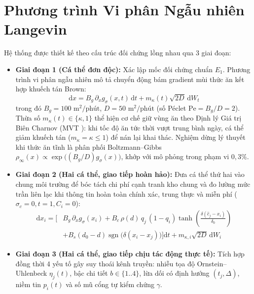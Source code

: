 \documentclass[11pt,a4paper]{report}
\newcommand{\dd}{\mathrm{d}}
\newcommand{\Pe}{\mathrm{Pe}}
\begin{document}
\section{Phương trình Vi phân Ngẫu nhiên Langevin}
Hệ thống được thiết kế theo cấu trúc đối chứng lồng nhau qua 3 giai đoạn:
\begin{itemize}
  \item \textbf{Giai đoạn 1 (Cá thể đơn độc):} Xác lập mốc đối chứng chuẩn $E_1$. Phương trình vi phân ngẫu nhiên mô tả chuyển động bám gradient mùi thức ăn kết hợp khuếch tán Brown:
  \begin{equation}
    \dd x = B_g\,\partial_x g_\sigma(x, t)\,\dd t + m_\kappa(t)\sqrt{2D}\,\dd W_t
  \end{equation}
  trong đó $B_g = 100\text{ m}^2/\text{phút}$, $D = 50\text{ m}^2/\text{phút}$ (số Péclet $\Pe = B_g/D = 2$). Thừa số $m_\kappa(t) \in \{\kappa, 1\}$ thể hiện cơ chế giữ vùng ăn theo Định lý Giá trị Biên Charnov (MVT \cite{charnov}): khi tốc độ ăn tức thời vượt trung bình ngày, cá thể giảm khuếch tán ($m_\kappa = \kappa \le 1$) để nán lại khai thác. Nghiệm dừng lý thuyết khi thức ăn tĩnh là phân phối Boltzmann--Gibbs $\rho_\infty(x) \propto \exp\big((B_g/D)g_\sigma(x)\big)$, khớp với mô phỏng trong phạm vi $0{,}3\%$.

  \item \textbf{Giai đoạn 2 (Hai cá thể, giao tiếp hoàn hảo):} Đưa cá thể thứ hai vào chung môi trường để bóc tách chi phí cạnh tranh kho chung và đo lường mức trần liên lạc khi thông tin hoàn toàn chính xác, trung thực và miễn phí ($\sigma_c = 0, t = 1, C_i = 0$):
  \begin{equation}
  \begin{split}
    \dd x_i = \Big[ &B_g\,\partial_x g_\sigma(x_i) + B_c\,\rho(d)\,q_j\,(1 - q_i)\tanh\!\left(\frac{\delta(\hat{c}_j - x_i)}{\delta_0}\right) \\
    &+ B_s(d_0 - d)\operatorname{sgn}\big(\delta(x_i - x_j)\big) \Big]\dd t + m_{\kappa,i}\sqrt{2D}\,\dd W_i
  \end{split}
  \end{equation}

  \item \textbf{Giai đoạn 3 (Hai cá thể, giao tiếp chịu tác động thực tế):} Tích hợp đồng thời 4 yếu tố gây suy thoái kênh truyền: nhiễu tọa độ Ornstein--Uhlenbeck $\eta_j(t)$, bậc chi tiết $b \in \{1..4\}$, lừa dối có định hướng $(t_j, \Delta)$, niềm tin $p_i(t)$ và số mũ cổng tự kiểm chứng $\gamma$.
\end{itemize}
\end{document}
